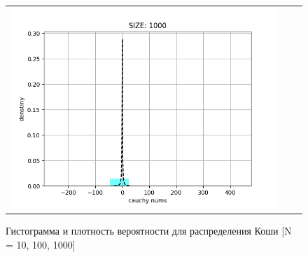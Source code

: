 \begin{itemize}
\begin{figure}[H]
\begin{tabular}{ccc}
			\includegraphics[scale=0.333]{task_1/resource/cauchy1000.png}
		\end{tabular}
		\caption{Гистограмма и плотность вероятности для распределения Коши [N = 10, 100, 1000]}
	\end{figure}
		

\end{itemize}
